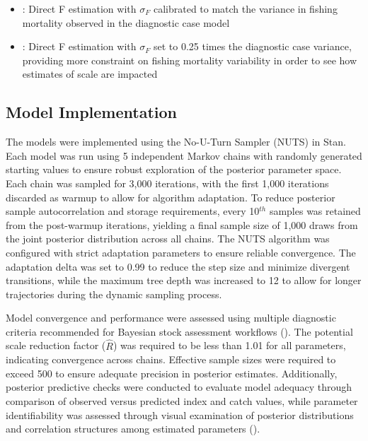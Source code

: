 \documentclass[
  11pt,
]{SCreport}
\providecommand{\tightlist}{%
  \setlength{\itemsep}{0pt}\setlength{\parskip}{0pt}}\usepackage{longtable,booktabs,array}
\begin{document}
\begin{itemize}
\tightlist
\item
  : Direct F estimation with \(\sigma_F\) calibrated to
  match the variance in fishing mortality observed in the diagnostic
  case model
\item
  : Direct F estimation with \(\sigma_F\) set to 0.25
  times the diagnostic case variance, providing more constraint on
  fishing mortality variability in order to see how estimates of scale
  are impacted
\end{itemize}

\subsection{Model Implementation}\label{sec-model-implementation}

The models were implemented using the No-U-Turn Sampler (NUTS) in Stan.
Each model was run using 5 independent Markov chains with randomly
generated starting values to ensure robust exploration of the posterior
parameter space. Each chain was sampled for 3,000 iterations, with the
first 1,000 iterations discarded as warmup to allow for algorithm
adaptation. To reduce posterior sample autocorrelation and storage
requirements, every 10\(^{th}\) samples was retained from the
post-warmup iterations, yielding a final sample size of 1,000 draws from
the joint posterior distribution across all chains. The NUTS algorithm
was configured with strict adaptation parameters to ensure reliable
convergence. The adaptation delta was set to 0.99 to reduce the step
size and minimize divergent transitions, while the maximum tree depth
was increased to 12 to allow for longer trajectories during the dynamic
sampling process.

Model convergence and performance were assessed using multiple
diagnostic criteria recommended for Bayesian stock assessment workflows
(). The potential
scale reduction factor (\(\hat{R}\)) was required to be less than 1.01
for all parameters, indicating convergence across chains. Effective
sample sizes were required to exceed 500 to ensure adequate precision in
posterior estimates. Additionally, posterior predictive checks were
conducted to evaluate model adequacy through comparison of observed
versus predicted index and catch values, while parameter identifiability
was assessed through visual examination of posterior distributions and
correlation structures among estimated parameters
().
\end{document}
